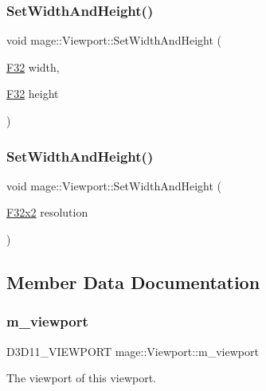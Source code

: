 \hypertarget{classmage_1_1_viewport_ab45df0ab7757f95d825fd724db663af5}{}\label{classmage_1_1_viewport_ab45df0ab7757f95d825fd724db663af5} 
\subsubsection{\texorpdfstring{Set\+Width\+And\+Height()}{SetWidthAndHeight()}\hspace{0.1cm}{\footnotesize\ttfamily [3/4]}}
{\footnotesize\ttfamily void mage\+::\+Viewport\+::\+Set\+Width\+And\+Height (\begin{DoxyParamCaption}\item[{\hyperlink{namespacemage_aa97e833b45f06d60a0a9c4fc22ae02c0}{F32}}]{width,  }\item[{\hyperlink{namespacemage_aa97e833b45f06d60a0a9c4fc22ae02c0}{F32}}]{height }\end{DoxyParamCaption})\hspace{0.3cm}{\ttfamily [noexcept]}}

\hypertarget{classmage_1_1_viewport_aac9ffe6dd252d6b0270f1c956e416ee7}{}\label{classmage_1_1_viewport_aac9ffe6dd252d6b0270f1c956e416ee7} 
\subsubsection{\texorpdfstring{Set\+Width\+And\+Height()}{SetWidthAndHeight()}\hspace{0.1cm}{\footnotesize\ttfamily [4/4]}}
{\footnotesize\ttfamily void mage\+::\+Viewport\+::\+Set\+Width\+And\+Height (\begin{DoxyParamCaption}\item[{\hyperlink{namespacemage_aa87237ad091f5cd7da612b8523fc108f}{F32x2}}]{resolution }\end{DoxyParamCaption})\hspace{0.3cm}{\ttfamily [noexcept]}}



\subsection{Member Data Documentation}
\hypertarget{classmage_1_1_viewport_a9509003aae2c6cd0f33cfc875cd235f4}{}\label{classmage_1_1_viewport_a9509003aae2c6cd0f33cfc875cd235f4} 
\subsubsection{\texorpdfstring{m\+\_\+viewport}{m\_viewport}}
{\footnotesize\ttfamily D3\+D11\+\_\+\+V\+I\+E\+W\+P\+O\+RT mage\+::\+Viewport\+::m\+\_\+viewport\hspace{0.3cm}{\ttfamily [private]}}

The viewport of this viewport. 